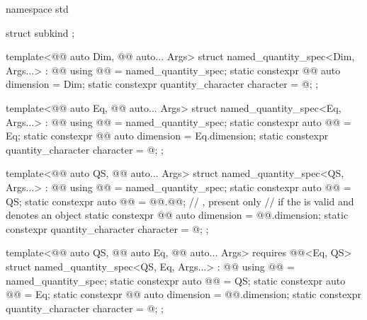 \begin{codeblock}
namespace std {

struct subkind {};

template<@@ auto Dim, @@ auto... Args>
struct named_quantity_spec<Dim, Args...> : @@ {
  using @@ = named_quantity_spec;
  static constexpr @@ auto dimension = Dim;
  static constexpr quantity_character character = @\seebelownc@;
};

template<@@ auto Eq, @@ auto... Args>
struct named_quantity_spec<Eq, Args...> : @@ {
  using @@ = named_quantity_spec;
  static constexpr auto @@ = Eq;
  static constexpr @@ auto dimension = Eq.dimension;
  static constexpr quantity_character character = @\seebelownc@;
};

template<@@ auto QS, @@ auto... Args>
struct named_quantity_spec<QS, Args...> : @@ {
  using @@ = named_quantity_spec;
  static constexpr auto @@ = QS;
  static constexpr auto @@ = @@.@@;  // \expos, present only
    // if the   is valid and denotes an object
  static constexpr @@ auto dimension = @@.dimension;
  static constexpr quantity_character character = @\seebelownc@;
};

template<@@ auto QS, @@ auto Eq, @@ auto... Args>
  requires @@<Eq, QS>
struct named_quantity_spec<QS, Eq, Args...> : @@ {
  using @@ = named_quantity_spec;
  static constexpr auto @@ = QS;
  static constexpr auto @@ = Eq;
  static constexpr @@ auto dimension = @@.dimension;
  static constexpr quantity_character character = @\seebelownc@;
};

}
\end{codeblock}

